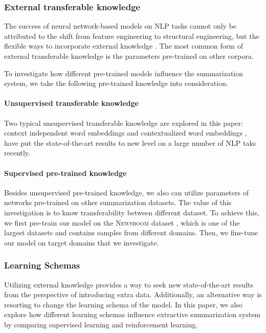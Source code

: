 \documentclass[11pt,a4paper]{article}
\begin{document}
\subsubsection{External transferable knowledge}
The success of neural network-based models on NLP tasks cannot only be attributed to the shift from feature engineering to structural engineering, but the flexible ways to incorporate external knowledge \cite{mikolov2013efficient,peters2018deep,devlin2018bert}.
The most common form of external transferable knowledge is the parameters pre-trained on other corpora.

To investigate how different pre-trained models influence the summarization system, we take the following pre-trained knowledge into consideration.


\paragraph{Unsupervised transferable knowledge}
Two typical unsupervised transferable knowledge are explored in this paper: context independent word embeddings \cite{mikolov2013efficient,pennington2014glove} and contextualized word embeddings
\cite{peters2018deep,devlin2018bert}, have put the state-of-the-art results to new level on a large number of NLP taks recently.





\paragraph{Supervised pre-trained knowledge}
Besides unsupervised pre-trained knowledge, we also can utilize parameters of networks pre-trained on other summarization datasets.
The value of this investigation is to know transferability between different dataset.
To achieve this, we first pre-train our model on the \textsc{Newsroom} dataset \cite{grusky2018newsroom}, which is one of the largest datasets and contains samples from different domains.
Then, we fine-tune our model on target domains that we investigate.


\subsubsection{Learning Schemas}
Utilizing external knowledge provides a way to seek new state-of-the-art results from the perspective of introducing extra data. Additionally, an alternative way is resorting to change the learning schema of the model. In this paper, we also explore how different learning schemas influence extractive summarization system by comparing supervised learning and reinforcement learning.
\end{document}

